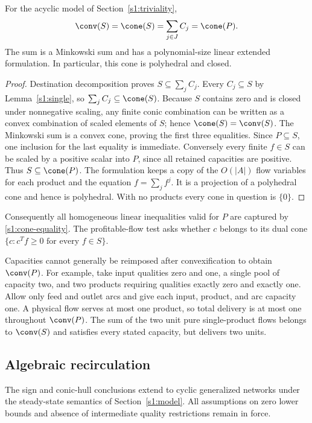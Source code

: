 \begin{theorem}\label{s1:cone-theorem}
For the acyclic model of Section~\ref{s1:triviality},
\begin{equation}
 \conv(S)=\cone(S)=\sum_{j\in J}C_j=\cone(P).\label{s1:cone-equality}
\end{equation}
The sum is a Minkowski sum and has a polynomial-size linear extended
formulation. In particular, this cone is polyhedral and closed.
\end{theorem}
\begin{proof}
Destination decomposition proves $S\subseteq\sum_jC_j$.
Every $C_j\subseteq S$ by Lemma~\ref{s1:single}, so
$\sum_jC_j\subseteq\cone(S)$. Because $S$ contains zero and is closed
under nonnegative scaling, any finite conic combination can be written
as a convex combination of scaled elements of $S$; hence
$\cone(S)=\conv(S)$. The Minkowski sum is a convex cone, proving the
first three equalities. Since $P\subseteq S$, one inclusion for the
last equality is immediate. Conversely every finite $f\in S$ can be
scaled by a positive scalar into $P$, since all retained capacities
are positive. Thus $S\subseteq\cone(P)$. The formulation keeps a copy
of the $O(|A|)$ flow variables for each product and the equation
$f=\sum_jf^j$. It is a projection of a polyhedral cone and hence is
polyhedral. With no products every cone in question is $\{0\}$.
\end{proof}

Consequently all homogeneous linear inequalities valid for $P$ are
captured by \eqref{s1:cone-equality}. The profitable-flow test asks whether
$c$ belongs to its dual cone $\{c:c^Tf\ge0\text{ for every }f\in S\}$.

Capacities cannot generally be reimposed after convexification to obtain
$\conv(P)$. For example, take input qualities zero and one, a single
pool of capacity two, and two products requiring qualities exactly zero
and exactly one. Allow only feed and outlet arcs and give each input,
product, and arc capacity one. A physical flow serves at most one
product, so total delivery is at most one throughout $\conv(P)$.
The sum of the two unit pure single-product flows belongs to
$\conv(S)$ and satisfies every stated capacity, but delivers two units.

\subsection{Algebraic recirculation}\label{s1:cycles}

The sign and conic-hull conclusions extend to cyclic generalized
networks under the steady-state semantics of
Section~\ref{s1:model}. All assumptions on zero lower bounds and
absence of intermediate quality restrictions remain in force.

